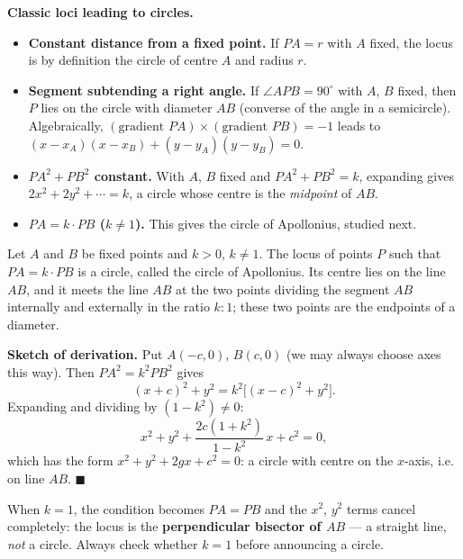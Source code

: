 \documentclass[11pt]{article}
\newcommand{\cle}[1]{{\popxbold\color{popdark}#1}}
\begin{document}
\textbf{Classic loci leading to circles.}\par
\begin{itemize}
\item \textbf{Constant distance from a fixed point.} If $PA = r$ with $A$ fixed, the locus is by definition the circle of centre $A$ and radius $r$.
\item \textbf{Segment subtending a right angle.} If $\angle APB = 90^{\circ}$ with $A$, $B$ fixed, then $P$ lies on the circle with diameter $AB$ (converse of the angle in a semicircle). Algebraically, $(\text{gradient } PA)\times(\text{gradient } PB) = -1$ leads to $(x - x_A)(x - x_B) + (y - y_A)(y - y_B) = 0$.
\item \textbf{$PA^2 + PB^2$ constant.} With $A$, $B$ fixed and $PA^2 + PB^2 = k$, expanding gives $2x^2 + 2y^2 + \cdots = k$, a circle whose centre is the \emph{midpoint} of $AB$.
\item \textbf{$PA = k \cdot PB$ ($k \neq 1$).} This gives the \cle{circle of Apollonius}, studied next.
\end{itemize}

\begin{propriete}
Let $A$ and $B$ be fixed points and $k > 0$, $k \neq 1$. The locus of points $P$ such that $PA = k \cdot PB$ is a circle, called the \cle{circle of Apollonius}. Its centre lies on the line $AB$, and it meets the line $AB$ at the two points dividing the segment $AB$ internally and externally in the ratio $k : 1$; these two points are the endpoints of a diameter.
\end{propriete}

\textbf{Sketch of derivation.} Put $A(-c, 0)$, $B(c, 0)$ (we may always choose axes this way). Then $PA^2 = k^2 PB^2$ gives
\[
(x+c)^2 + y^2 = k^2\big[(x-c)^2 + y^2\big].
\]
Expanding and dividing by $(1 - k^2) \neq 0$:
\[
x^2 + y^2 + \frac{2c(1+k^2)}{1-k^2}\,x + c^2 = 0,
\]
which has the form $x^2 + y^2 + 2gx + c^2 = 0$: a circle with centre on the $x$-axis, i.e. on line $AB$. $\blacksquare$

\begin{attention}[The case $k = 1$]
When $k = 1$, the condition becomes $PA = PB$ and the $x^2$, $y^2$ terms cancel completely: the locus is the \textbf{perpendicular bisector of $AB$} — a straight line, \emph{not} a circle. Always check whether $k = 1$ before announcing a circle.
\end{attention}
\end{document}
